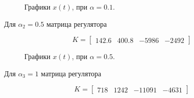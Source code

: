 \begin{figure}[!h]
\caption{Графики $x(t)$, при $\alpha = 0.1$.}
\label{4_3_1}
\end{figure}




Для $\alpha_2=0.5$ матрица регулятора

\begin{equation}
    K = \begin{bmatrix}
        142.6 & 400.8 & -5986 & -2492
    \end{bmatrix}
\end{equation}

\begin{figure}[!h]
\caption{Графики $x(t)$, при $\alpha = 0.5$.}
\label{4_3_2}
\end{figure}


Для $\alpha_3=1$ матрица регулятора

\begin{equation}
    K = \begin{bmatrix}
        718& 1242 & -11091 & -4631
    \end{bmatrix}
\end{equation}


